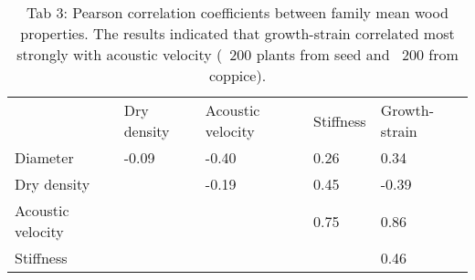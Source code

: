\begin{table}
\centering
\caption{Tab 3: Pearson correlation coefficients between family mean wood properties. The results indicated that growth-strain correlated most strongly with acoustic velocity (~200 plants from seed and ~200 from coppice).}
\label{my-label}
\begin{tabular}{lllll}
                  & Dry density       & Acoustic velocity & Stiffness & Growth-strain        \\
Diameter          & -0.09             & -0.40     & 0.26          & 0.34  \\
Dry density       &                   & -0.19     & 0.45          & -0.39 \\
Acoustic velocity &                   &           & 0.75          & 0.86  \\
Stiffness         &                   &           &               & 0.46 
\end{tabular}
\end{table}